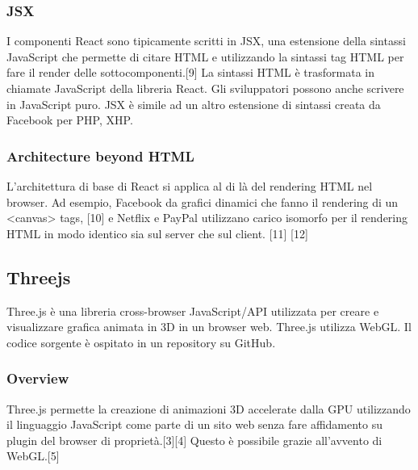 \subsubsection{JSX}
I componenti React sono tipicamente scritti in JSX, una estensione della sintassi JavaScript che permette di citare
HTML e utilizzando la sintassi tag HTML per fare  il render delle sottocomponenti.[9]
La sintassi HTML è trasformata in chiamate JavaScript
della libreria React. Gli sviluppatori possono anche scrivere in JavaScript puro. JSX è simile ad un altro
estensione di sintassi creata da Facebook per PHP, XHP.

\subsubsection{Architecture beyond HTML}
L'architettura di base di React si applica al di là del rendering HTML nel browser. Ad esempio, Facebook
da grafici dinamici che fanno il rendering di un <canvas> tags, [10] e Netflix e PayPal utilizzano carico isomorfo per
il rendering HTML in modo identico sia sul server che sul client. [11] [12]


\newpage
\subsection{Threejs}
Three.js \`e una libreria cross-browser JavaScript/API utilizzata per creare e visualizzare grafica animata in 3D
in un browser web. Three.js utilizza WebGL. Il codice sorgente è ospitato in un repository su GitHub.

\subsubsection{Overview}
Three.js permette la creazione di animazioni 3D accelerate dalla GPU utilizzando il linguaggio JavaScript
come parte di un sito web senza fare affidamento su plugin del browser di proprietà.[3][4]
 Questo è possibile grazie all'avvento di WebGL.[5]


